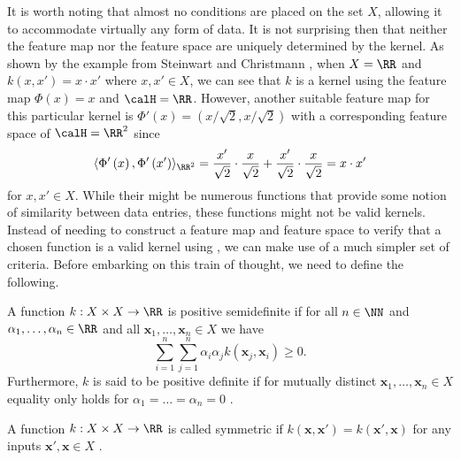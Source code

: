 It is worth noting that almost no conditions are placed on the set $X$, allowing it to accommodate virtually any form of data. It is not surprising then that neither the feature map nor the feature space are uniquely determined by the kernel. As shown by the example from Steinwart and Christmann \cite{SteinwartIngo2008SVMb}, when $X = \RR$ and $k \left( x , x' \right) = x \cdot x'$ where $x , x' \in X$, we can see that $k$ is a kernel using the feature map $\Phi \left( x \right) = x$ and $\calH = \RR$. However, another suitable feature map for this particular kernel is $\Phi' \left( x \right) = \left( x / \sqrt{2} , x / \sqrt{2} \right)$ with a corresponding feature space of $\calH = \RR^2$ since
\[
    \langle \Phi' \left( x \right), \Phi' \left( x' \right) \rangle_{\RR^2} = \frac{x'}{\sqrt{2}} \cdot \frac{x}{\sqrt{2}} + \frac{x'}{\sqrt{2}} \cdot \frac{x}{\sqrt{2}} = x \cdot x'
\]
for $x,x' \in X$. While their might be numerous functions that provide some notion of similarity between data entries, these functions might not be valid kernels. Instead of needing to construct a feature map and feature space to verify that a chosen function is a valid kernel using , we can make use of a much simpler set of criteria. Before embarking on this train of thought, we need to define the following.

\begin{defe} \label{defe: PD}
    A function $k : X \times X \to \RR$ is positive semidefinite if for all $n \in \NN$ and $\alpha_1 , \ldots , \alpha_n \in \RR$ and all $\bm{x}_1 ,\ldots , \bm{x}_n \in X$ we have
    \begin{equation}\label{eq: PSD}
        \sum_{i=1}^{n} \sum_{j=1}^{n} \alpha_i \alpha_j k \left( \bm{x}_j , \bm{x}_i \right) \geq 0.
    \end{equation}
    Furthermore, $k$ is said to be positive definite if for mutually distinct $\bm{x}_1 ,\ldots , \bm{x}_n \in X$ equality  only holds for $\alpha_1 = \ldots = \alpha_n = 0$ \cite{SteinwartIngo2008SVMb}.
\end{defe}

\begin{defe}[Symmetric] \label{defe: Symmetric_function}
    A function $k : X \times X \to \RR$ is called symmetric if $k \left( \bm{x} , \bm{x}' \right) = k \left( \bm{x}' , \bm{x} \right)$ for any inputs $\bm{x}' , \bm{x} \in X$ \cite{SteinwartIngo2008SVMb}.
\end{defe}

